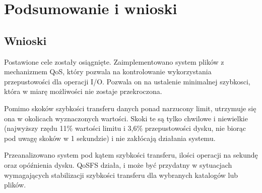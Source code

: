 \chapter{Podsumowanie i wnioski} \label{ch:summary}

\section{Wnioski}

Postawione cele zostały osiągnięte. Zaimplementowano system plików z mechanizmem
QoS, który pozwala na kontrolowanie wykorzystania przepustowości dla
operacji I/O. Pozwala on na ustalenie minimalnej szybkosci, która w miarę możliwości
nie zostaje przekroczona.

Pomimo skoków szybkości transferu danych ponad narzucony limit,
utrzymuje się ona w okolicach wyznaczonych wartości. Skoki te są
tylko chwilowe i niewielkie (najwyższy rzędu 11\% wartości limitu i 3,6\% przepustowości dysku, nie biorąc pod uwagę
skoków w 1 sekundzie) i nie zakłócają działania systemu.

Przeanalizowano system pod kątem szybkości transferu, ilości operacji na sekundę
oraz opóźnienia dysku. QoSFS działa, i może być przydatny w sytuacjach wymagających
stabilizacji szybkości transferu dla wybranych katalogów lub plików.

